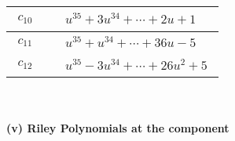 \documentclass[1p]{elsarticle_modified}
\theoremstyle{definition}
\begin{document}
\begin{tabular}{m{50pt}|m{274pt}}
\hline $$\begin{aligned}c_{10}\end{aligned}$$&$\begin{aligned}
&u^{35}+3 u^{34}+\cdots+2 u+1
\end{aligned}$\\
\hline $$\begin{aligned}c_{11}\end{aligned}$$&$\begin{aligned}
&u^{35}+u^{34}+\cdots+36 u-5
\end{aligned}$\\
\hline $$\begin{aligned}c_{12}\end{aligned}$$&$\begin{aligned}
&u^{35}-3 u^{34}+\cdots+26 u^2+5
\end{aligned}$\\
\hline
\end{tabular}\\~\\
\newpage\renewcommand{\arraystretch}{1}
\flushleft \textbf{(v) Riley Polynomials at the component}\newline \\
\end{document}
